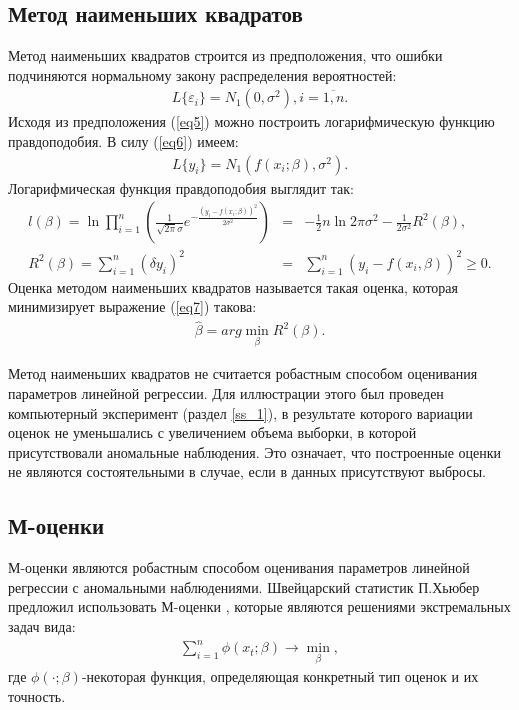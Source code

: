 \subsection{Метод наименьших квадратов}
Метод наименьших квадратов строится из предположения, что ошибки подчиняются нормальному закону распределения вероятностей:
\begin{eqnarray}
    \label{eq5}L\{\varepsilon_i\}=N_1(0,\sigma^2), i = \overline{1,n}.
\end{eqnarray}
Исходя из предположения (\ref{eq5}) можно построить логарифмическую функцию правдоподобия. В силу (\ref{eq6}) имеем:
\begin{eqnarray}
    L\{y_i\}=N_1(f(x_i;\beta), \sigma^2).
\end{eqnarray}
Логарифмическая функция правдоподобия выглядит так\cite{Kharin}:
\begin{eqnarray}
    l(\beta)=\ln \prod_{i=1}^{n}(\frac{1}{\sqrt{2\pi}\sigma}e^{-\frac{(y_i-f(x_i;\beta))^2}{2\sigma^2}})&=&-\frac{1}{2}n\ln{2\pi\sigma^2}-\frac{1}{2\sigma^2}R^2(\beta),\\
    \label{eq7}R^2(\beta)=\sum_{i=1}^{n}(\delta y_i)^2&=&\sum_{i=1}^{n}(y_i-f(x_i,\beta))^2\geq 0.
\end{eqnarray}
Оценка методом наименьших квадратов называется такая оценка, которая минимизирует  выражение (\ref{eq7}) такова:
\begin{eqnarray}
    \hat{\beta}=arg \min_{\beta}R^2(\beta).
\end{eqnarray}

Метод наименьших квадратов не считается робастным способом оценивания параметров линейной регрессии. Для иллюстрации этого был проведен компьютерный эксперимент (раздел \ref{ss_1}), в результате которого вариации оценок не уменьшались с увеличением объема выборки, в которой присутствовали аномальные наблюдения.
Это означает, что построенные оценки не являются состоятельными в случае, если в данных присутствуют выбросы.

\subsection{М-оценки}
М-оценки являются робастным способом оценивания параметров линейной регрессии с аномальными наблюдениями.
Швейцарский статистик П.Хьюбер предложил использовать М-оценки \cite{Kharin}, которые являются решениями экстремальных задач вида:
\begin{eqnarray}
    \sum_{i=1}^{n}\phi(x_t;\beta)\rightarrow \min_{\beta},
\end{eqnarray}
где $\phi(\cdot;\beta)$-некоторая функция, определяющая конкретный тип оценок и их точность.

